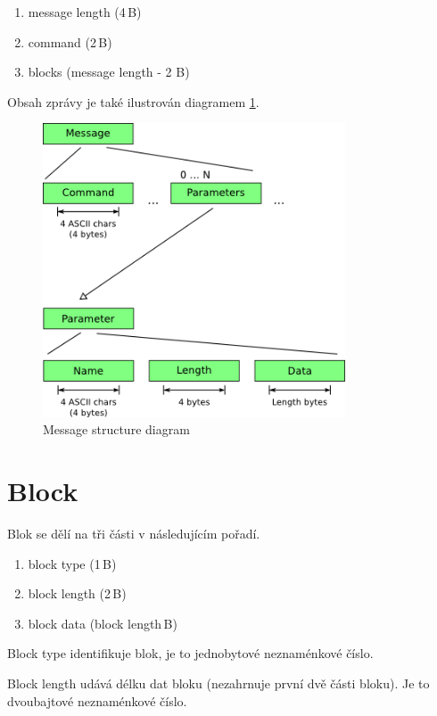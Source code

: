 \documentclass[12pt,oneside,a4paper]{report}
\begin{document}
\begin{enumerate}
	\item message length (4\,{}B)
	\item command (2\,{}B)
	\item blocks (message length - 2 B)
\end{enumerate}

Obsah zprávy je také ilustrován diagramem \ref{picture.message_structure}.

\begin{figure}[h]
  \centering
  \includegraphics[width=0.80\textwidth]{diagrams/message_structure_diagram.png}
  \caption{Message structure diagram}
  \label{picture.message_structure}
\end{figure}

\section{Block}
\label{text.collab_message.block}

Blok se dělí na tři části v následujícím pořadí.

\begin{enumerate}
	\item block type (1\,{}B)
	\item block length (2\,{}B)
	\item block data (block length\,{}B)
\end{enumerate}

Block type identifikuje blok, je to jednobytové neznaménkové číslo.

Block length udává délku dat bloku (nezahrnuje první dvě části bloku). Je to dvoubajtové neznaménkové číslo.
\end{document}
